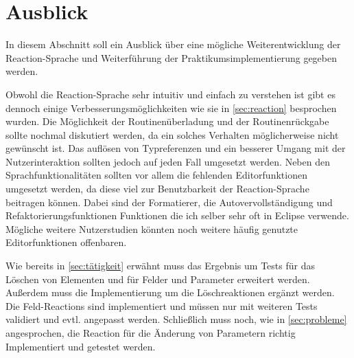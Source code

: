 \documentclass[ngerman,runningheads]{llncs}
\begin{document}
\section{Ausblick}
\label{sec:ausblick}
In diesem Abschnitt soll ein Ausblick über eine mögliche Weiterentwicklung der Reaction-Sprache und Weiterführung der Praktikumsimplementierung gegeben werden. \par
Obwohl die Reaction-Sprache sehr intuitiv und einfach zu verstehen ist gibt es dennoch einige Verbesserungsmöglichkeiten wie sie in \autoref{sec:reaction} besprochen wurden. Die Möglichkeit der Routinenüberladung und der Routinenrückgabe sollte nochmal diskutiert werden, da ein solches Verhalten möglicherweise nicht gewünscht ist. Das auflösen von Typreferenzen und ein besserer Umgang mit der Nutzerinteraktion sollten jedoch auf jeden Fall umgesetzt werden. Neben den Sprachfunktionalitäten sollten vor allem die fehlenden Editorfunktionen umgesetzt werden, da diese viel zur Benutzbarkeit der Reaction-Sprache beitragen können. Dabei sind der Formatierer, die Autovervollständigung und Refaktorierungsfunktionen Funktionen die ich selber sehr oft in Eclipse verwende. Mögliche weitere Nutzerstudien könnten noch weitere häufig genutzte Editorfunktionen offenbaren. \par 
Wie bereits in \autoref{sec:tätigkeit} erwähnt muss das Ergebnis um Tests für das Löschen von Elementen und für Felder und Parameter erweitert werden. Außerdem muss die Implementierung um die Löschreaktionen ergänzt werden. Die Feld-Reactions sind implementiert und müssen nur mit weiteren Tests validiert und evtl. angepasst werden. Schließlich muss noch, wie in \autoref{sec:probleme} angesprochen, die Reaction für die Änderung von Parametern richtig Implementiert und getestet werden. 
%


\end{document}
